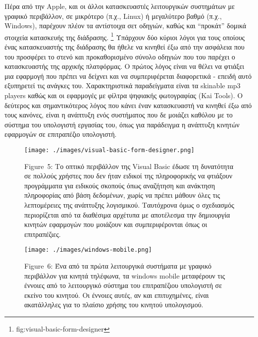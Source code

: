 \documentclass[
]{article}
\begin{document}
Πέρα από την Apple, και οι άλλοι κατασκευαστές λειτουργικών συστημάτων
με γραφικό περιβάλλον, σε μικρότερο (π.χ., Linux) ή μεγαλύτερο βαθμό
(π.χ., Windows), παρέχουν πλέον τα αντίστοιχα σετ οδηγιών, καθώς και
``προκάτ'' δομικά στοιχεία κατασκευής της διάδρασης. \footnote{fig:visual-basic-form-designer}
Υπάρχουν δύο κύριοι λόγοι για τους οποίους ένας κατασκευαστής της
διάδρασης θα ήθελε να κινηθεί έξω από την ασφάλεια που του προσφέρει το
στενό και προκαθορισμένο σύνολο οδηγιών που του παρέχει ο κατασκευαστής
της αρχικής πλατφόρμας. Ο πρώτος λόγος είναι να θέλει να φτιάξει μια
εφαρμογή που πρέπει να δείχνει και να συμπεριφέρεται διαφορετικά -
επειδή αυτό εξυπηρετεί τις ανάγκες του. Χαρακτηριστικά παραδείγματα
είναι τα skinable mp3 players καθώς και οι εφαρμογές με φίλτρα ψηφιακής
φωτογραφίας (Kai Tools). Ο δεύτερος και σημαντικότερος λόγος που κάνει
έναν κατασκευαστή να κινηθεί έξω από τους κανόνες, είναι η ανάπτυξη ενός
συστήματος που δε μοιάζει καθόλου με το σύστημα του υπολογιστή εργασίας
του, όπως για παράδειγμα η ανάπτυξη κινητών εφαρμογών σε επιτραπέζιο
υπολογιστή.

\leavevmode{}%
\begin{figure}
\hypertarget{fig:visual-basic-form-designer}{%
\centering
\texttt{[image: ./images/visual-basic-form-designer.png]}
\caption{Figure~5: Το οπτικό περιβάλλον της Visual Basic έδωσε τη
δυνατότητα σε πολλούς χρήστες που δεν ήταν ειδικοί της πληροφορικής να
φτιάξουν προγράμματα για ειδικούς σκοπούς όπως αναζήτηση και ανάκτηση
πληροφορίας από βάση δεδομένων, χωρίς να πρέπει μάθουν όλες τις
λεπτομέρειες της ανάπτυξης λογισμικού. Ταυτόχρονα όμως ο σχεδιασμός
περιορίζεται από τα διαθέσιμα αρχέτυπα με αποτέλεσμα την δημιουργία
κινητών εφαρμογών που μοιάζουν και συμπεριφέρονται όπως οι
επιτραπέζιες.}\label{fig:visual-basic-form-designer}
}
\end{figure}

\leavevmode{}%
\begin{figure}
\hypertarget{fig:windows-mobile}{%
\centering
\texttt{[image: ./images/windows-mobile.png]}
\caption{Figure~6: Ένα από τα πρώτα λειτουργικά συστήματα με γραφικό
περιβάλλον για κινητά τηλέφωνα, τα windows mobile μεταφέρουν τις έννοιες
από το λειτουργικό σύστημα του επιτραπέζιου υπολογιστή σε εκείνο του
κινητού. Οι έννοιες αυτές, αν και επιτυχημένες, είναι ακατάλληλες για το
πλαίσιο χρήσης του κινητού υπολογισμού.}\label{fig:windows-mobile}
}
\end{figure}
\end{document}
